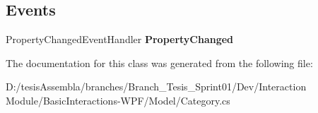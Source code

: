 \subsection*{Events}
\begin{DoxyCompactItemize}
\item 
\hypertarget{class_microsoft_1_1_samples_1_1_kinect_1_1_basic_interactions_1_1_category_af3c75ffb771087f95d263d15a4d1281a}{Property\-Changed\-Event\-Handler {\bfseries Property\-Changed}}\label{class_microsoft_1_1_samples_1_1_kinect_1_1_basic_interactions_1_1_category_af3c75ffb771087f95d263d15a4d1281a}

\end{DoxyCompactItemize}


The documentation for this class was generated from the following file\-:\begin{DoxyCompactItemize}
\item 
D\-:/tesis\-Assembla/branches/\-Branch\-\_\-\-Tesis\-\_\-\-Sprint01/\-Dev/\-Interaction Module/\-Basic\-Interactions-\/\-W\-P\-F/\-Model/Category.\-cs\end{DoxyCompactItemize}
